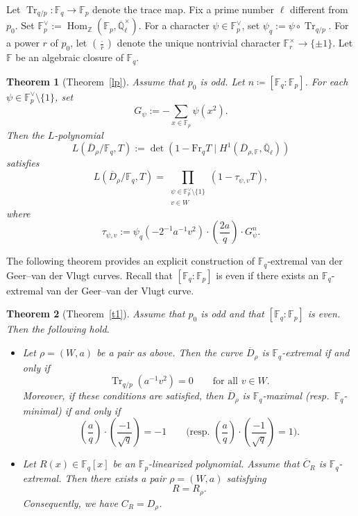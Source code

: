 \documentclass[12pt,a4paper]{amsart}
\newtheorem{theorem}{Theorem}[section]
\theoremstyle{definition}
\def\F{{\mathbb F}}
\def\Ql{\overline{\mathbb{Q}}_\ell}
\theoremstyle{remark}
\DeclareMathOperator{\Hom}{Hom}
\DeclareMathOperator{\Tr}{Tr}
\begin{document}
Let $\Tr_{q/p} \colon \F_q \to \F_p$ denote the trace map. 
Fix a prime number $\ell$ different from $p_0$. Set $\F_p^\vee:=\Hom_{\mathbb{Z}}(\F_p,\Ql^\times)$. 
For a character $\psi \in \F_p^{\vee}$, set  
 $\psi_q:=\psi \circ \Tr_{q/p}$. 
  For a power $r$ of $p_0$, let $\left(\frac{\cdot}{r}\right)$ denote the unique nontrivial character $\F_r^\times\to\{\pm1\}$.  
  Let $\F$ be an algebraic closure of $\F_q$. 
\begin{theorem}[{Theorem~\ref{lp}}]
Assume that $p_0$ is odd. Let $n\coloneqq[\F_q:\F_p]$. 
For each $\psi\in \F_p^\vee\setminus\{1\}$, set 
\[
G_{\psi}:=-\sum_{x \in \F_p} \psi(x^2). 
\]
Then the $L$-polynomial  
\[
L(\overline{D}_{\rho}/\F_q, T):=\det(1-\mathrm{Fr}_q  T \mid 
H^1(\overline{D}_{\rho,\F},\Ql)) 
\]
satisfies  
\[
L(\overline{D}_{\rho}/\F_q, T)=\prod_{\substack{\psi\in\F_p^\vee\setminus\{1\} \\ v\in W}} (1-\tau_{\psi,v} T), 
\]
where 
\[
\tau_{\psi,v}:=\psi_q(-2^{-1} a^{-1} v^2) \cdot \left(\frac{2a}{q}\right) \cdot 
G_{\psi}^n. 
\]
\end{theorem}


The following theorem 
provides an explicit construction 
of $\F_q$-extremal van der Geer--van der Vlugt curves. Recall that $[\F_q:\F_p]$ is even if there exists an $\F_q$-extremal van der Geer--van der Vlugt curve. 
\begin{theorem}[{Theorem~\ref{t1}}]\label{theorem:  intro}
Assume that $p_0$ is odd and that $[\F_q:\F_p]$ is even. Then the following hold.  
\begin{itemize}
\item[{\rm (i)}] Let $\rho=(W,a)$ be a pair as above. 
Then the curve $\overline{D}_\rho$ is $\F_q$-extremal if and only if 
\[\Tr_{q/p}(a^{-1}v^2)=0 \qquad\text{for all }v\in W.\]
Moreover, if these conditions are satisfied, then $\overline{D}_\rho$ is $\F_q$-maximal (resp.\ $\F_q$-minimal) if and only if 
    \[
    \left(\frac{a}{q}\right)\cdot \left(\frac{-1}{\sqrt{q}}\right)=-1 \qquad\text{(resp. }\left(\frac{a}{q}\right)\cdot \left(\frac{-1}{\sqrt{q}}\right)=1). 
    \]
\item[{\rm (ii)}] 
Let $R(x)\in\F_q[x]$ be an $\F_p$-linearized polynomial. Assume that  $\overline{C}_R$ is 
$\F_q$-extremal. Then there exists a pair $\rho=(W,a)$ satisfying 
\[R=R_\rho. \]
Consequently, we have $C_{R}=D_\rho$. 
\end{itemize}
\end{theorem}
\end{document}
